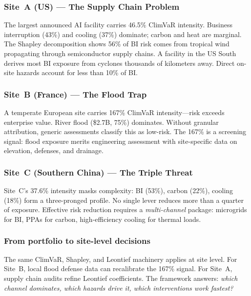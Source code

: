 \begin{twocolbody}

\subsubsection*{Site~A (US) — The Supply Chain Problem}

\noindent The largest announced AI facility carries 46.5\% ClimVaR intensity. Business interruption (43\%) and cooling (37\%) dominate; carbon and heat are marginal. The Shapley decomposition shows 56\% of BI risk comes from tropical wind propagating through semiconductor supply chains. A facility in the US South derives most BI exposure from cyclones thousands of kilometers away. Direct on-site hazards account for less than 10\% of BI.

\subsubsection*{Site~B (France) — The Flood Trap}

\noindent A temperate European site carries 167\% ClimVaR intensity---risk exceeds enterprise value. River flood (\$2.7B, 75\%) dominates. Without granular attribution, generic assessments classify this as low-risk. The 167\% is a screening signal: flood exposure merits engineering assessment with site-specific data on elevation, defenses, and drainage.

\subsubsection*{Site~C (Southern China) — The Triple Threat}

\noindent Site~C's 37.6\% intensity masks complexity: BI (53\%), carbon (22\%), cooling (18\%) form a three-pronged profile. No single lever reduces more than a quarter of exposure. Effective risk reduction requires a \textit{multi-channel} package: microgrids for BI, PPAs for carbon, high-efficiency cooling for thermal loads.

\subsubsection*{From portfolio to site-level decisions}

\noindent The same ClimVaR, Shapley, and Leontief machinery applies at site level. For Site~B, local flood defense data can recalibrate the 167\% signal. For Site~A, supply chain audits refine Leontief coefficients. The framework answers: \textit{which channel dominates, which hazards drive it, which interventions work fastest?}

\end{twocolbody}

